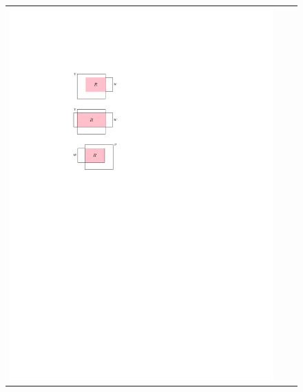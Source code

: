 \documentclass[lotsofwhite]{patmorin}
\begin{document}
\begin{figure}
\begin{tabular}{ccc}
   \includegraphics{figs/hvo-2} & 

\end{tabular}
\end{figure}
\end{document}
